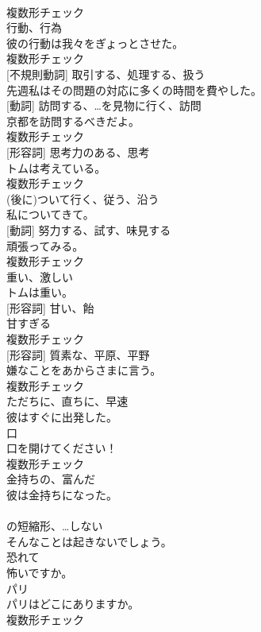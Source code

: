 \documentclass[8pt]{extreport}
\begin{document}
\begin{CJK}{UTF8}{min}
\\	複数形チェック
\\	[名詞]	行動、行為	
\\	彼の行動は我々をぎょっとさせた。	
\\	複数形チェック
\\	[動詞] [不規則動詞]	取引する、処理する、扱う	
\\	先週私はその問題の対応に多くの時間を費やした。	
\\	[名詞] [動詞]	訪問する、…を見物に行く、訪問	
\\	京都を訪問するべきだよ。	
\\	複数形チェック
\\	[名詞] [形容詞]	思考力のある、思考	
\\	トムは考えている。	
\\	複数形チェック
\\	[動詞]	(後に)ついて行く、従う、沿う	
\\	私についてきて。	
\\	[名詞] [動詞]	努力する、試す、味見する	
\\	頑張ってみる。	
\\	複数形チェック
\\	[形容詞]	重い、激しい	
\\	トムは重い。	
\\	[名詞] [形容詞]	甘い、飴	
\\	甘すぎる	
\\	複数形チェック
\\	[名詞] [形容詞]	質素な、平原、平野	
\\	嫌なことをあからさまに言う。	
\\	複数形チェック
\\	[副詞]	ただちに、直ちに、早速	
\\	彼はすぐに出発した。	
\\	[名詞]	口	
\\	口を開けてください！	
\\	複数形チェック
\\	[形容詞]	金持ちの、富んだ	
\\	彼は金持ちになった。	
\\	[短縮形]	
\\	の短縮形、…しない	
\\	そんなことは起きないでしょう。	
\\	[形容詞]	恐れて	
\\	怖いですか。	
\\	[名詞]	パリ	
\\	パリはどこにありますか。	
\\	複数形チェック

\end{CJK}
\end{document}
